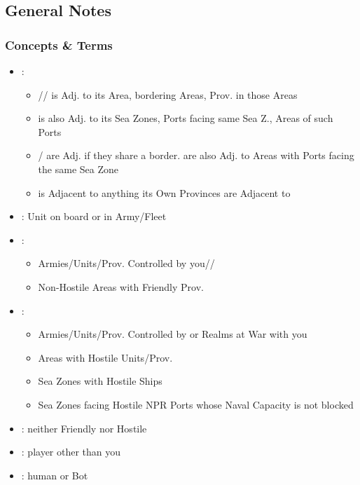\documentclass[10pt]{article}
\begin{document}
\addbackground
\addfooter


\subsection*{General Notes }
\subsubsection*{Concepts \& Terms}
\begin{itemize}
	\item {}:
	\begin{itemize}
		\item {}// is Adj. to its Area, bordering Areas, Prov. in those Areas
		\item {} is also Adj. to its Sea Zones, Ports facing same Sea Z., Areas of such Ports
		\item {}/ are Adj. if they share a border.  are also Adj. to Areas with Ports facing the same Sea Zone
		\item {} is Adjacent to anything its Own Provinces are Adjacent to
	\end{itemize}
	\item {}: Unit on board or in Army/Fleet
	\item {}:
	\begin{itemize}
		\item Armies/Units/Prov. Controlled by you/\ally/\vassal
		\item Non-Hostile Areas with Friendly Prov.
	\end{itemize}
	\item {}:
	\begin{itemize}
		\item Armies/Units/Prov. Controlled by \rebels or Realms at War with you
		\item Areas with Hostile Units/Prov.
		\item Sea Zones with Hostile Ships
		\item Sea Zones facing Hostile NPR Ports whose Naval Capacity is not blocked
	\end{itemize}
	\item {}: neither Friendly nor Hostile
	\item {}: player other than you
	\item {}: human or Bot

\end{itemize}
\end{document}
